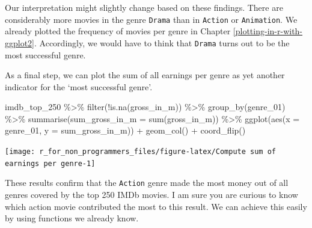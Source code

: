 \documentclass[
]{book}
\newenvironment{Shaded}{\begin{snugshade}}{\end{snugshade}}
\newcommand{\AttributeTok}[1]{\textcolor[rgb]{0.77,0.63,0.00}{#1}}
\newcommand{\FunctionTok}[1]{\textcolor[rgb]{0.00,0.00,0.00}{#1}}
\newcommand{\NormalTok}[1]{#1}
\newcommand{\SpecialCharTok}[1]{\textcolor[rgb]{0.00,0.00,0.00}{#1}}
\begin{document}
Our interpretation might slightly change based on these findings. There are considerably more movies in the genre \texttt{Drama} than in \texttt{Action} or \texttt{Animation}. We already plotted the frequency of movies per genre in Chapter \ref{plotting-in-r-with-ggplot2}. Accordingly, we would have to think that \texttt{Drama} turns out to be the most successful genre.

As a final step, we can plot the sum of all earnings per genre as yet another indicator for the `most successful genre'.

\begin{Shaded}
\begin{Highlighting}[]
\NormalTok{imdb\_top\_250 }\SpecialCharTok{\%\textgreater{}\%}
  \FunctionTok{filter}\NormalTok{(}\SpecialCharTok{!}\FunctionTok{is.na}\NormalTok{(gross\_in\_m)) }\SpecialCharTok{\%\textgreater{}\%}
  \FunctionTok{group\_by}\NormalTok{(genre\_01) }\SpecialCharTok{\%\textgreater{}\%}
  \FunctionTok{summarise}\NormalTok{(}\AttributeTok{sum\_gross\_in\_m =} \FunctionTok{sum}\NormalTok{(gross\_in\_m)) }\SpecialCharTok{\%\textgreater{}\%}
  \FunctionTok{ggplot}\NormalTok{(}\FunctionTok{aes}\NormalTok{(}\AttributeTok{x =}\NormalTok{ genre\_01, }\AttributeTok{y =}\NormalTok{ sum\_gross\_in\_m)) }\SpecialCharTok{+}
  \FunctionTok{geom\_col}\NormalTok{() }\SpecialCharTok{+}
  \FunctionTok{coord\_flip}\NormalTok{()}
\end{Highlighting}
\end{Shaded}

\begin{center}\texttt{[image: r\_for\_non\_programmers\_files/figure-latex/Compute sum of earnings per genre-1]} \end{center}

These results confirm that the \texttt{Action} genre made the most money out of all genres covered by the top 250 IMDb movies. I am sure you are curious to know which action movie contributed the most to this result. We can achieve this easily by using functions we already know.
\end{document}
